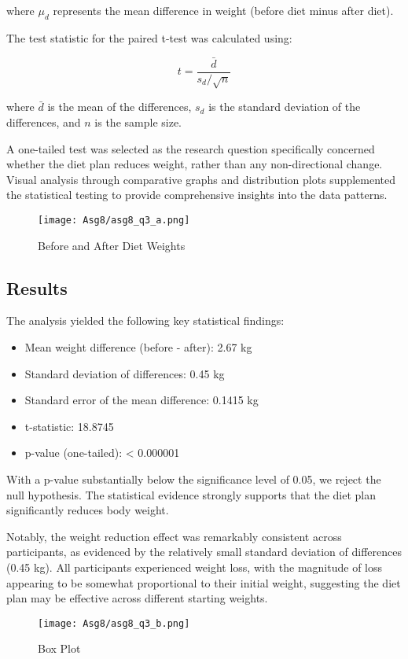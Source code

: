 \documentclass[12pt]{article}
\begin{document}
\noindent where $\mu_d$ represents the mean difference in weight (before diet minus after diet).

The test statistic for the paired t-test was calculated using:

\begin{equation}
t = \frac{\bar{d}}{s_d / \sqrt{n}}
\end{equation}

\noindent where $\bar{d}$ is the mean of the differences, $s_d$ is the standard deviation of the differences, and $n$ is the sample size.

A one-tailed test was selected as the research question specifically concerned whether the diet plan reduces weight, rather than any non-directional change. Visual analysis through comparative graphs and distribution plots supplemented the statistical testing to provide comprehensive insights into the data patterns.

\begin{figure}[H]
    \centering
    \texttt{[image: Asg8/asg8\_q3\_a.png]}
    \caption{Before and After Diet Weights}
    \label{fig:enter-label}
\end{figure}

\subsection{Results}
The analysis yielded the following key statistical findings:

\begin{itemize}
    \item Mean weight difference (before - after): 2.67 kg
    \item Standard deviation of differences: 0.45 kg
    \item Standard error of the mean difference: 0.1415 kg
    \item t-statistic: 18.8745
    \item p-value (one-tailed): < 0.000001
\end{itemize}

With a p-value substantially below the significance level of 0.05, we reject the null hypothesis. The statistical evidence strongly supports that the diet plan significantly reduces body weight.

Notably, the weight reduction effect was remarkably consistent across participants, as evidenced by the relatively small standard deviation of differences (0.45 kg). All participants experienced weight loss, with the magnitude of loss appearing to be somewhat proportional to their initial weight, suggesting the diet plan may be effective across different starting weights.
\begin{figure}[H]
    \centering
    \texttt{[image: Asg8/asg8\_q3\_b.png]}
    \caption{Box Plot}
    \label{fig:enter-label}
\end{figure}
\end{document}
